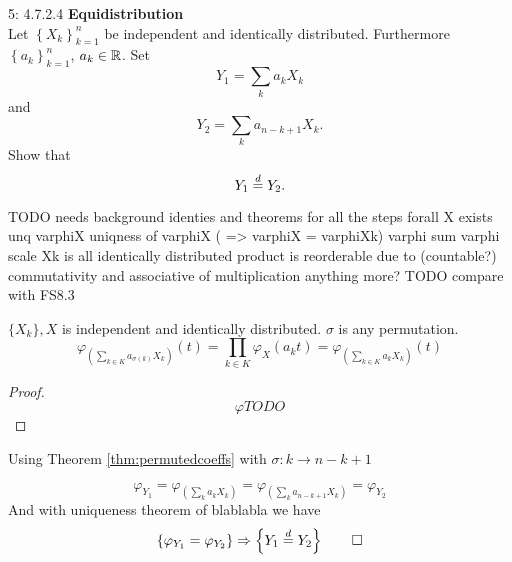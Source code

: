 \documentclass[a4paper,twoside=false,abstract=false,numbers=noenddot,
titlepage=false,headings=small,parskip=half,version=last]{scrartcl}
\begin{document}
\begin{exercise}{5: 4.7.2.4} \textbf{Equidistribution} \\
    Let $\left\{{X_k}\right\}_{k=1}^n$ be independent and identically
    distributed. Furthermore $\left\{{a_k}\right\}_{k=1}^n$, $a_k \in \mathbb{R}$. Set
    \begin{equation}
        Y_1 = \sum\limits_k a_k X_k
    \end{equation}
    and
    \begin{equation}
        Y_2 = \sum\limits_k a_{n-k+1} X_k.
    \end{equation}
    Show that
    \begin{equation}
        Y_1 \stackrel{d}{=} Y_2.
    \end{equation}
\end{exercise}
\begin{solution}
    TODO needs background identies and theorems for all the steps
    forall X exists unq varphiX
    uniqness of varphiX ( => varphiX = varphiXk)
    varphi sum
    varphi scale
    Xk is all identically distributed
    product is reorderable due to (countable?) commutativity and associative of
    multiplication
    anything more?
    TODO compare with FS8.3

    \begin{identity}
        \label{thm:permutedcoeffs}
        $\{X_k\}, X$ is independent and identically distributed.
        $\sigma$ is any permutation.
        \begin{equation}
            \varphi_{\left(\sum\limits_{k\in K}a_{\sigma(k)} X_k\right)}(t) =
            \prod\limits_{k\in K} \varphi_X (a_k t) =
            \varphi_{\left(\sum\limits_{k\in K}a_{k} X_k\right)}(t)
        \end{equation}
    \end{identity}
    \begin{proof}
        \begin{equation}
            \varphi TODO
        \end{equation}
    \end{proof}

    Using Theorem \ref{thm:permutedcoeffs} with
    $\sigma: k\rightarrow n-k+1$

    \begin{equation}
        \varphi_{Y_1} =
        \varphi_{\left(\sum\limits_k a_k X_k\right)} =
        \varphi_{\left(\sum\limits_k a_{n-k+1} X_k\right)} =
        \varphi_{Y_2}
    \end{equation}
    And with uniqueness theorem of blablabla we have
    \begin{equation}
        \left\{\varphi_{Y_1} = \varphi_{Y_2}\right\} \Rightarrow
        \left\{Y_1 \stackrel{d}{=} Y_2\right\} \qed
    \end{equation}
\end{solution}
\pagebreak
\end{document}
